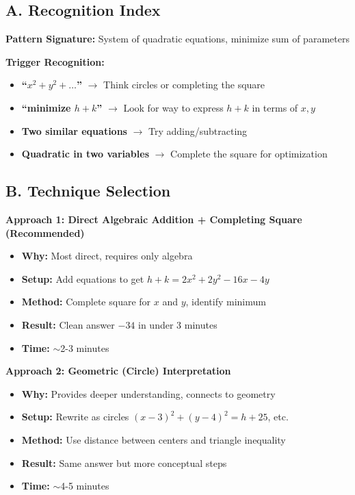 \documentclass[12pt]{article}
\begin{document}
\begin{techniquesbox}
\subsection*{A. Recognition Index}

\textbf{Pattern Signature:} System of quadratic equations, minimize sum of parameters

\textbf{Trigger Recognition:}
\begin{itemize}
    \item \textbf{``$x^2 + y^2 + \ldots$''} $\to$ Think circles or completing the square
    \item \textbf{``minimize $h + k$''} $\to$ Look for way to express $h + k$ in terms of $x, y$
    \item \textbf{Two similar equations} $\to$ Try adding/subtracting
    \item \textbf{Quadratic in two variables} $\to$ Complete the square for optimization
\end{itemize}

\subsection*{B. Technique Selection}

\textbf{Approach 1: Direct Algebraic Addition + Completing Square (Recommended)}
\begin{itemize}
    \item \textbf{Why:} Most direct, requires only algebra
    \item \textbf{Setup:} Add equations to get $h + k = 2x^2 + 2y^2 - 16x - 4y$
    \item \textbf{Method:} Complete square for $x$ and $y$, identify minimum
    \item \textbf{Result:} Clean answer $-34$ in under 3 minutes
    \item \textbf{Time:} $\sim$2-3 minutes
\end{itemize}

\textbf{Approach 2: Geometric (Circle) Interpretation}
\begin{itemize}
    \item \textbf{Why:} Provides deeper understanding, connects to geometry
    \item \textbf{Setup:} Rewrite as circles $(x - 3)^2 + (y - 4)^2 = h + 25$, etc.
    \item \textbf{Method:} Use distance between centers and triangle inequality
    \item \textbf{Result:} Same answer but more conceptual steps
    \item \textbf{Time:} $\sim$4-5 minutes
\end{itemize}


\end{techniquesbox}
\end{document}
